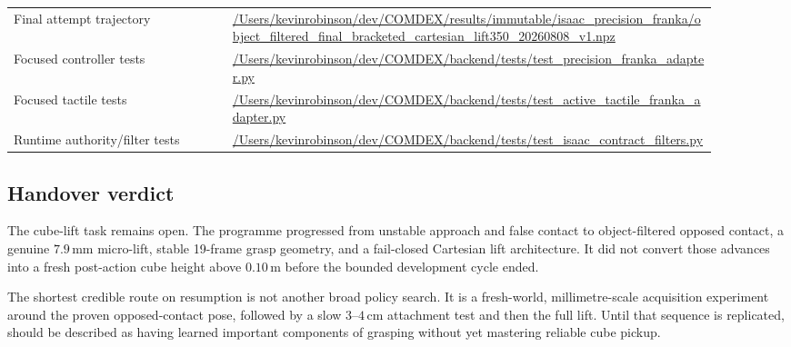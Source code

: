 \begin{longtable}{>{\raggedright\arraybackslash}p{0.28\linewidth}
                  >{\raggedright\arraybackslash}p{0.62\linewidth}}
Final attempt trajectory &
\url{/Users/kevinrobinson/dev/COMDEX/results/immutable/isaac_precision_franka/object_filtered_final_bracketed_cartesian_lift350_20260808_v1.npz} \\
Focused controller tests &
\url{/Users/kevinrobinson/dev/COMDEX/backend/tests/test_precision_franka_adapter.py} \\
Focused tactile tests &
\url{/Users/kevinrobinson/dev/COMDEX/backend/tests/test_active_tactile_franka_adapter.py} \\
Runtime authority/filter tests &
\url{/Users/kevinrobinson/dev/COMDEX/backend/tests/test_isaac_contract_filters.py} \\
\bottomrule
\end{longtable}

\subsection{Handover verdict}

The cube-lift task remains open.  The programme progressed from unstable
approach and false contact to object-filtered opposed contact, a genuine
$7.9\,\mathrm{mm}$ micro-lift, stable 19-frame grasp geometry, and a fail-closed
Cartesian lift architecture.  It did not convert those advances into a fresh
post-action cube height above $0.10\,\mathrm{m}$ before the bounded development
cycle ended.

The shortest credible route on resumption is not another broad policy search.
It is a fresh-world, millimetre-scale acquisition experiment around the proven
opposed-contact pose, followed by a slow $3$--$4\,\mathrm{cm}$ attachment test
and then the full lift.  Until that sequence is replicated, 
\AION{} should be described as having learned important components of grasping
without yet mastering reliable cube pickup.
